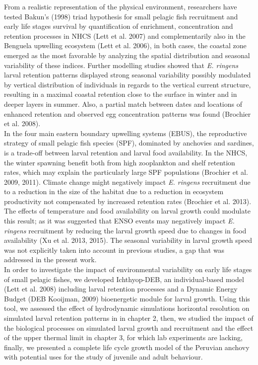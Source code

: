 From a realistic representation of the physical environment, researchers have tested \citep{Baku1998} Bakun's (1998) triad hypothesis for small pelagic fish recruitment and early life stages survival by quantification of enrichment, concentration and retention processes in NHCS \citep{LettPenv2007}(Lett et al. 2007) and complementarily also in the Benguela upwelling ecosystem \citep{LettRoy2006}(Lett et al. 2006), in both cases, the coastal zone emerged as the most favorable by analyzing the spatial distribution and seasonal variability of these indices. Further modelling studies showed that \textit{E. ringens} larval retention patterns displayed strong seasonal variability possibly modulated by vertical distribution of individuals in regards to the vertical current structure, resulting in a maximal coastal retention close to the surface in winter and in deeper layers in summer. Also, a partial match between dates and locations of enhanced retention and observed egg concentration patterns was found \citep{BrocLett2008}(Brochier et al. 2008).\\

In the four main eastern boundary upwelling systems (EBUS), the reproductive strategy of small pelagic fish species (SPF), dominated by anchovies and sardines, is a trade-off between larval retention and larval food availability. In the NHCS, the winter spawning benefit both from high zooplankton and shelf retention rates, which may explain the particularly  large SPF populations \citep{BrocCola2009,BrocLett2011}(Brochier et al. 2009, 2011). Climate change might negatively impact \textit{E. ringens} recruitment due to a reduction in the size of the habitat due to a reduction in ecosystem productivity not compensated by increased retention rates \citep{BrocEche2013}(Brochier et al. 2013). The effects of temperature and food availability on larval growth could modulate this result; as it was suggested that ENSO events may negatively impact \textit{E. ringens}  recruitment by reducing the larval growth speed due to changes in food availability \citep{XuChai2013,XuRose2015}(Xu et al. 2013, 2015). The seasonal variability in larval growth speed was not explicitly taken into account in previous studies, a gap that was addressed in the present work.\\

In order to investigate the impact of environmental variability on early life stages of small pelagic fishes, we developed Ichthyop-DEB, an individual-based model \citep{LettVerl2008}(Lett et al. 2008) including larval retention processes and a Dynamic Energy Budget (DEB \citep{Kooi2009} Kooijman, 2009) bioenergetic module for larval growth. Using this tool, we assessed the effect of hydrodynamic simulations horizontal resolution on simulated larval retention patterns in in chapter 2, then, we studied the impact of the biological processes on simulated larval growth and recruitment and the effect of the upper thermal limit in chapter 3, for which lab experiments are lacking, finally, we presented a complete life cycle growth model of the Peruvian anchovy with potential uses for the study of juvenile and adult behaviour.\\